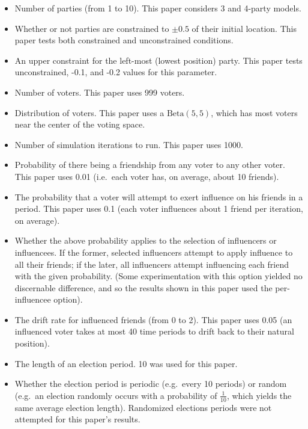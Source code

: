 \documentclass[12pt]{article}
\numberwithin{equation}{subsection}
\begin{document}
\begin{itemize}
    \item Number of parties (from 1 to 10).  This paper considers 3 and 4-party models.
    \item Whether or not parties are constrained to $\pm 0.5$ of their initial location.  This
        paper tests both constrained and unconstrained conditions.
    \item An upper constraint for the left-most (lowest position) party.  This paper tests
        unconstrained, -0.1, and -0.2 values for this parameter.
    \item Number of voters.  This paper uses 999 voters.
    \item Distribution of voters.  This paper uses a $\textrm{Beta}(5, 5)$, which has most voters
        near the center of the voting space.
    \item Number of simulation iterations to run.  This paper uses 1000.
    \item Probability of there being a friendship from any voter to any other voter.  This paper
        uses 0.01 (i.e.\ each voter has, on average, about 10 friends).
    \item The probability that a voter will attempt to exert influence on his friends in a period.
        This paper uses 0.1 (each voter influences about 1 friend per iteration, on average).
    \item Whether the above probability applies to the selection of influencers or influencees.  If
        the former, selected influencers attempt to apply influence to all their friends; if the
        later, all influencers attempt influencing each friend with the given probability.  (Some
        experimentation with this option yielded no discernable difference, and so the results shown
        in this paper used the per-influencee option).
    \item The drift rate for influenced friends (from 0 to 2).  This paper uses 0.05 (an influenced
        voter takes at most 40 time periods to drift back to their natural position).
    \item The length of an election period.  10 was used for this paper.
    \item Whether the election period is periodic (e.g.\ every 10 periods) or random (e.g.\ an
        election randomly occurs with a probability of $\frac{1}{10}$, which yields the same average
        election length).  Randomized elections periods were not attempted for this paper's results.
\end{itemize}
\end{document}
